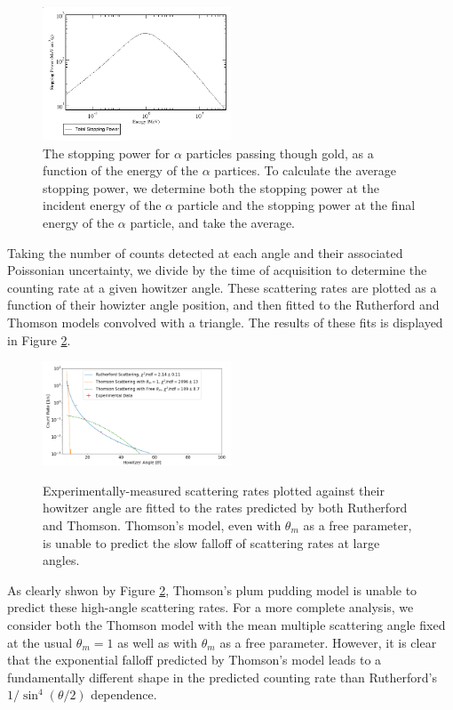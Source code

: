    \begin{figure}[h]
     \includegraphics[width=0.5\textwidth]{nist.png}
     \caption{The stopping power for $\alpha$ particles passing though gold, as a function of the energy of the $\alpha$ partices. To calculate the average stopping power, we determine both the stopping power at the incident energy of the $\alpha$ particle and the stopping power at the final energy of the $\alpha$ particle, and take the average.}
     \label{stop}
   \end{figure}

Taking the number of counts detected at each angle and their associated Poissonian uncertainty, we divide by the time of acquisition to determine the counting rate at a given howitzer angle. These scattering rates are plotted as a function of their howizter angle position, and then fitted to the Rutherford and Thomson models convolved with a triangle. The results of these fits is displayed in Figure \ref{final-plot}.

\begin{figure}[h]
  \includegraphics[width=0.5\textwidth]{plot-error.png}
  \label{final-plot}
  \caption{Experimentally-measured scattering rates plotted against their howitzer angle are fitted to the rates predicted by both Rutherford and Thomson. Thomson's model, even with $\theta_m$ as a free parameter, is unable to predict the slow falloff of scattering rates at large angles.}
\end{figure}
As clearly shwon by Figure \ref{final-plot}, Thomson's plum pudding model is unable to predict these high-angle scattering rates. For a more complete analysis, we consider both the Thomson model with the mean multiple scattering angle fixed at the usual $\theta_m = 1$ as well as with $\theta_m$ as a free parameter. However, it is clear that the exponential falloff predicted by Thomson's model leads to a fundamentally different shape in the predicted counting rate than Rutherford's $1/\sin^4(\theta/2)$ dependence.

